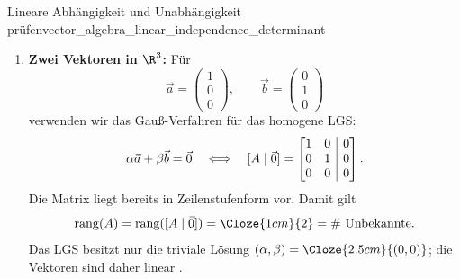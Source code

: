 \begin{ExampleBox}{Lineare Abhängigkeit und Unabhängigkeit prüfen}{vector_algebra_linear_independence_determinant}
\begin{enumerate}[label=\alph*),leftmargin=*,itemsep=0.8em]
    \item \textbf{Zwei Vektoren in $\R^3$:}
      Für
      \[
        \vec a=\begin{pmatrix}1\\0\\0\end{pmatrix},\qquad
        \vec b=\begin{pmatrix}0\\1\\0\end{pmatrix}
      \]
      verwenden wir das Gauß-Verfahren für das homogene LGS:
      \[
        \alpha\vec a+\beta\vec b=\vec0
        \quad\Longleftrightarrow\quad
        [A\mid\vec0]
        =\left[
          \begin{array}{@{}rr|r@{}}
            1&0&0\\
            0&1&0\\
            0&0&0
          \end{array}
        \right].
      \]
      Die Matrix liegt bereits in Zeilenstufenform vor. Damit gilt
      \[
        \operatorname{rang}(A)
        =\operatorname{rang}([A\mid\vec0])
        =\Cloze{1cm}{2}
        =\#\text{ Unbekannte}.
      \]
      Das LGS besitzt nur die triviale Lösung
      $(\alpha,\beta)=\Cloze{2.5cm}{(0,0)}$; die Vektoren sind daher linear
      .
  \end{enumerate}
\end{ExampleBox}
